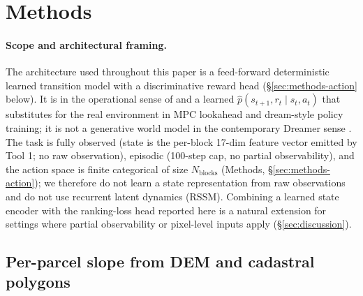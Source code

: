 \documentclass[11pt]{article}
\begin{document}
\section*{Methods}
\label{sec:methods}

\paragraph{Scope and architectural framing.} The architecture used throughout this paper is a feed-forward deterministic learned transition model with a discriminative reward head (\S\ref{sec:methods-action} below). It is in the operational sense of \citet{chua2018deep} and \citet{janner2019trust} a learned $\hat{p}(s_{t+1}, r_t \mid s_t, a_t)$ that substitutes for the real environment in MPC lookahead and dream-style policy training; it is not a generative world model in the contemporary Dreamer sense \citep{hafner2025dreamerv3,ha2018world}. The task is fully observed (state is the per-block 17-dim feature vector emitted by Tool 1; no raw observation), episodic (100-step cap, no partial observability), and the action space is finite categorical of size $N_{\text{blocks}}$ (Methods, \S\ref{sec:methods-action}); we therefore do not learn a state representation from raw observations and do not use recurrent latent dynamics (RSSM). Combining a learned state encoder with the ranking-loss head reported here is a natural extension for settings where partial observability or pixel-level inputs apply (\S\ref{sec:discussion}).

\subsection*{Per-parcel slope from DEM and cadastral polygons}\label{sec:methods-prepare}
\end{document}

